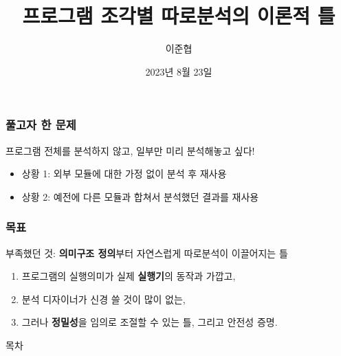 \documentclass{beamer}
\title{프로그램 조각별 따로분석의 이론적 틀}
\author{이준협}
\date{2023년 8월 23일}
\institute{SIGPL 2023 여름학교}
\begin{document}
\maketitle
\begin{frame}[c]
  \frametitle{풀고자 한 문제}
  프로그램 전체를 분석하지 않고, 일부만 미리 분석해놓고 싶다!
  \begin{itemize}
    \item 상황 1: 외부 모듈에 대한 가정 없이 분석 후 재사용
    \item 상황 2: 예전에 다른 모듈과 합쳐서 분석했던 결과를 재사용
  \end{itemize}
  \pause
  \begin{center}

  \end{center}
\end{frame}
\begin{frame}[c]
  \frametitle{목표}
  부족했던 것: \textbf{의미구조 정의}부터 자연스럽게 따로분석이 이끌어지는 틀
  \begin{enumerate}
    \item 프로그램의 실행의미가 실제 \textbf{실행기}의 동작과 가깝고,
    \item 분석 디자이너가 신경 쓸 것이 많이 없는,
    \item 그러나 \textbf{정밀성}을 임의로 조절할 수 있는 틀, 그리고 안전성 증명.
  \end{enumerate}
\end{frame}
\begin{frame}{목차}
  \tableofcontents
\end{frame}
\end{document}
